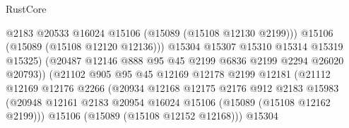\begin{lexlean}{RustCore}
\begin{coremodule}
                                            @2183
                                            @20533
                                            @16024
                                            @15106
                                            (@15089 (@15108 @12130 @2199)))
                                          @15106
                                          (@15089 (@15108 @12120 @12136)))
                                        @15304
                                        @15307
                                        @15310
                                        @15314
                                        @15319
                                        @15325)
                                      (@20487
                                        @12146
                                        @888
                                        @95
                                        @45
                                        @2199
                                        @6836
                                        @2199
                                        @2294
                                        @26020
                                        @20793))
                                    (@21102
                                      @905
                                      @95
                                      @45
                                      @12169
                                      @12178
                                      @2199
                                      @12181
                                      (@21112
                                        @12169
                                        @12176
                                        @2266
                                        (@20934
                                          @12168
                                          @12175
                                          @2176
                                          @912
                                          @2183
                                          @15983
                                          (@20948
                                            @12161
                                            @2183
                                            @20954
                                            @16024
                                            @15106
                                            (@15089 (@15108 @12162 @2199)))
                                          @15106
                                          (@15089 (@15108 @12152 @12168)))
                                        @15304

\end{coremodule}
\end{lexlean}

